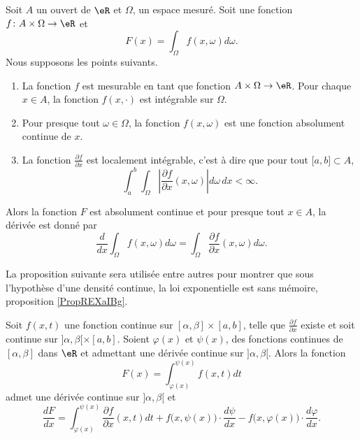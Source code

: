 \begin{theorem}     \label{ThoDerSousIntegrale}
    Soit \( A\) un ouvert de \( \eR\) et \( \Omega\), un espace mesuré. Soit une fonction \( f\colon A\times \Omega\to \eR\) et
    \begin{equation}
        F(x)=\int_{\Omega}f(x,\omega)d\omega.
    \end{equation}
    Nous supposons les points suivants.
    \begin{enumerate}
        \item
            La fonction \( f\) est mesurable en tant que fonction \( A\times\Omega\to \eR\). Pour chaque \( x\in A\), la fonction \( f(x,\cdot)\) est intégrable sur \( \Omega\).
        \item
            Pour presque tout \( \omega\in\Omega\), la fonction \( f(x,\omega)\) est une fonction absolument continue de \( x\).
        \item
            La fonction \( \frac{ \partial f }{ \partial x }\) est localement intégrable, c'est à dire que pour tout \( \mathopen[ a , b \mathclose]\subset A\),
            \begin{equation}
                \int_a^b\int_{\Omega}\left| \frac{ \partial f }{ \partial x }(x,\omega) \right| d\omega\,dx<\infty.
            \end{equation}
    \end{enumerate}
    Alors la fonction \( F\) est absolument continue et pour presque tout \( x\in A\), la dérivée est donné par
    \begin{equation}
        \frac{ d }{ dx }\int_{\Omega}f(x,\omega)d\omega=\int_{\Omega}\frac{ \partial f }{ \partial x }(x,\omega)d\omega.
    \end{equation}
\end{theorem}

La proposition suivante sera utilisée entre autres pour montrer que sous l'hypothèse d'une densité continue, la loi exponentielle est sans mémoire, proposition \ref{PropREXaIBg}.
\begin{proposition}		\label{PropDerrFnAvecBornesFonctions}
Soit $f(x,t)$ une fonction continue sur $[\alpha,\beta]\times[a,b]$, telle que $\frac{ \partial f }{ \partial x }$ existe et soit continue sur $]\alpha,\beta[\times[a,b]$. Soient $\varphi(x)$ et $\psi(x)$, des fonctions continues de $[\alpha,\beta]$ dans $\eR$ et admettant une dérivée continue sur $]\alpha,\beta [$. Alors la fonction
\begin{equation}
	F(x)=\int_{\varphi(x)}^{\psi(x)}f(x,t)dt
\end{equation}
admet une dérivée continue sur $]\alpha,\beta[$ et
\begin{equation}	\label{EqFormDerrFnAvecBorneNInt}
	\frac{ dF }{ dx }=\int_{\varphi(x)}^{\psi(x)}\frac{ \partial f }{ \partial x }(x,t)dt+f\big( x,\psi(x) \big)\cdot\frac{ d\psi }{ dx }- f\big( x,\varphi(x) \big)\cdot\frac{ d\varphi }{ dx }.
\end{equation}
\end{proposition}

